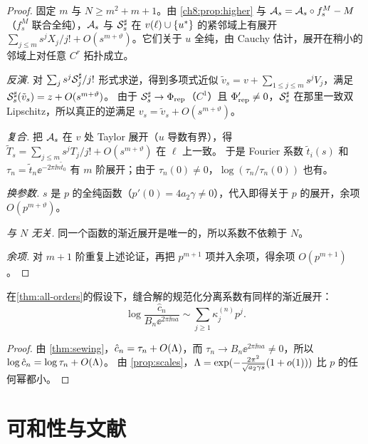 \begin{proof}
固定 $m$ 与 $N\ge m^2+m+1$。由 \cref{ch8:prop:higher} 与 $\mathcal A_s=\mathcal A_s\circ f_s^M-M$（$f_s^M$ 联合全纯），$\mathcal A_s$ 与 $\mathcal S^\sharp_s$ 在 $v(\ell)\cup\{u^{*}\}$ 的紧邻域上有展开
$\sum_{j\le m}s^jX_j/j!+O(s^{m+\vartheta})$。它们关于 $u$ 全纯，由 Cauchy 估计，展开在稍小的邻域上对任意 $C^r$ 拓扑成立。

\emph{反演.} 对 $\sum_js^j\mathcal S^\sharp_j/j!$ 形式求逆，得到多项式近似 $\tilde v_s=v+\sum_{1\le j\le m}s^jV_j$，满足 $\mathcal S^\sharp_s(\tilde v_s)=z+O(s^{m+\vartheta})$。
由于 $\mathcal S^\sharp_s\to\Phi_{\mathrm{rep}}$（$C^1$）且 $\Phi_{\mathrm{rep}}'\ne0$，$\mathcal S^\sharp_s$ 在那里一致双 Lipschitz，所以真正的逆满足 $v_s=\tilde v_s+O(s^{m+\vartheta})$。

\emph{复合.} 把 $\mathcal A_s$ 在 $v$ 处 Taylor 展开（$u$ 导数有界），得 $\tilde T_s=\sum_{j\le m}s^jT_j/j!+O(s^{m+\vartheta})$ 在 $\ell$ 上一致。
于是 Fourier 系数 $\tilde t_i(s)$ 和 $\tau_n=\tilde t_n\ee^{-2\pi\ii n\tilde t_0}$ 有 $m$ 阶展开；由于 $\tau_n(0)\ne0$，$\log(\tau_n/\tau_n(0))$ 也有。

\emph{换参数.} $s$ 是 $p$ 的全纯函数（$p'(0)=4a_2\gamma\ne0$），代入即得关于 $p$ 的展开，余项 $O(p^{m+\vartheta})$。

\emph{与 $N$ 无关.} 同一个函数的渐近展开是唯一的，所以系数不依赖于 $N$。

\emph{余项.} 对 $m+1$ 阶重复上述论证，再把 $p^{m+1}$ 项并入余项，得余项 $O(p^{m+1})$。
\end{proof}

\begin{corollary}\label{ch8:cor:sewing}
在\cref{thm:all-orders}的假设下，缝合解的规范化分离系数有同样的渐近展开：
\[
 \log\frac{\hat c_n}{B_n\ee^{2\pi\ii na}}\sim\sum_{j\ge1}\kappa^{(n)}_jp^j .
\]
\end{corollary}

\begin{proof}
由 \cref{thm:sewing}，$\hat c_n=\tau_n+O(\Lambda)$，而 $\tau_n\to B_n\ee^{2\pi\ii na}\ne0$，所以 $\log\hat c_n=\log\tau_n+O(\Lambda)$。
由 \cref{prop:scales}，$\Lambda=\exp(-\frac{2\pi^2}{\sqrt{a_2\gamma s}}(1+o(1)))$ 比 $p$ 的任何幂都小。
\end{proof}

\section{可和性与文献}\label{ch8:sec:literature}

